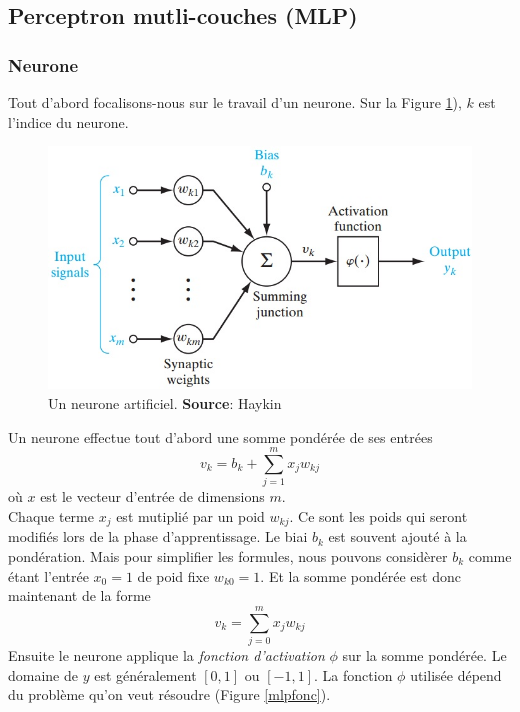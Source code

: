 \subsection{Perceptron mutli-couches (MLP)}
\subsubsection{Neurone}
Tout d'abord focalisons-nous sur le travail d'un neurone.
Sur la Figure \ref{neuronemlp}), $k$ est l'indice du neurone.
\begin{figure}
 \centering
 \includegraphics[scale=0.5]{../figures/neurone.jpg}
 \caption{Un neurone artificiel. \textbf{Source}: Haykin\cite{Haykin}}
 \label{neuronemlp}
\end{figure}
Un neurone effectue tout d'abord une somme pondérée de ses entrées \[v_k = b_k+\sum_{j=1}^{m}x_{j}w_{kj}\] où $x$ est le vecteur d'entrée de dimensions $m$.\\
Chaque terme $x_j$ est mutiplié par un poid $w_{kj}$. Ce sont les poids qui seront modifiés lors de la phase d'apprentissage.
Le biai $b_k$ est souvent ajouté à la pondération. Mais pour simplifier les formules, nous pouvons considèrer $b_k$ comme étant l'entrée $x_0 = 1$ de poid fixe $w_{k0} = 1$.
Et la somme pondérée est donc maintenant de la forme \[v_k = \sum_{j=0}^{m}x_{j}w_{kj}\]
Ensuite le neurone applique la \emph{fonction d'activation} $\phi$ sur la somme pondérée.
Le domaine de $y$ est généralement $[0,1]$ ou $[-1,1]$.\cite{Haykin,statistica}
La fonction $\phi$ utilisée dépend du problème qu'on veut résoudre (Figure \ref{mlpfonc}).
